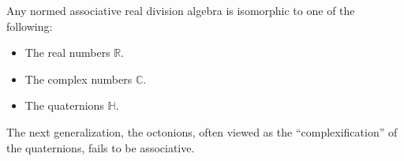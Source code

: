 \documentclass[12pt]{article}
\newcommand{\<}{\langle}
\renewcommand{\>}{\rangle}
\begin{document}
Any normed associative real division algebra is isomorphic to one of the following:
\begin{itemize}
\item The real numbers $\mathbb{R}$.
\item The complex numbers $\mathbb{C}$.
\item The quaternions $\mathbb{H}$.
\end{itemize}

The next generalization, the octonions, often viewed as the ``complexification'' of the quaternions, fails to be associative.
\end{document}
